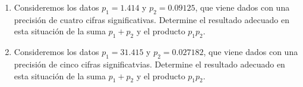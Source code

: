 \begin{enunciado}
 $\phantom{0}$
 \begin{enumerate}
  \item Consideremos los datos $p_1 = 1.414$ y $p_2 = 0.09125$, que viene dados con una precisi\'on de cuatro cifras significativas. Determine el resultado adecuado en esta situaci\'on de la suma $p_1 + p_2$ y el producto $p_1p_2$.
  
  \item Consideremos los datos $p_1 = 31.415$ y $p_2 = 0.027182$, que viene dados con una precisi\'on de cinco cifras significatvias. Determine el resultado adecuado en esta situaci\'on de la suma $p_1 + p_2$ y el producto $p_1p_2$.
 \end{enumerate}
\end{enunciado}

